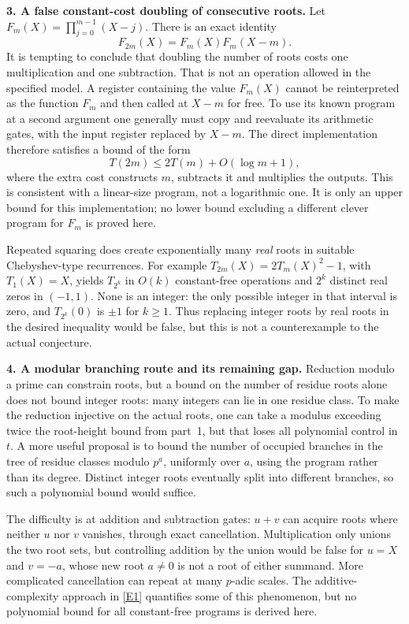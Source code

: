 \documentclass[11pt,a4paper]{article}
\newcommand{\eref}[2]{\hyperlink{extra:#1:#2}{[E#2]}}
\numberwithin{equation}{section}
\begin{document}
\textbf{3. A false constant-cost doubling of consecutive roots.}
Let $F_m(X)=\prod_{j=0}^{m-1}(X-j)$. There is an exact identity
\begin{equation}\label{224:falling}
 F_{2m}(X)=F_m(X)F_m(X-m).
\end{equation}
It is tempting to conclude that doubling the number of roots costs one
multiplication and one subtraction. That is not an operation allowed in
the specified model. A register containing the value $F_m(X)$ cannot be
reinterpreted as the function $F_m$ and then called at $X-m$ for free.
To use its known program at a second argument one generally must copy
and reevaluate its arithmetic gates, with the input register replaced by
$X-m$. The direct implementation therefore satisfies a bound of the form
\[
 T(2m)\le 2T(m)+O(\log m+1),
\]
where the extra cost constructs $m$, subtracts it and multiplies the
outputs. This is consistent with a linear-size program, not a logarithmic
one. It is only an upper bound for this implementation; no lower bound
excluding a different clever program for $F_m$ is proved here.

Repeated squaring does create exponentially many \emph{real} roots in
suitable Chebyshev-type recurrences. For example
$T_{2m}(X)=2T_m(X)^2-1$, with $T_1(X)=X$, yields $T_{2^k}$ in $O(k)$
constant-free operations and $2^k$ distinct real zeros in $(-1,1)$.
None is an integer: the only possible integer in that interval is zero,
and $T_{2^k}(0)$ is $\pm1$ for $k\ge1$. Thus replacing integer roots by
real roots in the desired inequality would be false, but this is not a
counterexample to the actual conjecture.

\textbf{4. A modular branching route and its remaining gap.}
Reduction modulo a prime can constrain roots, but a bound on the number
of residue roots alone does not bound integer roots: many integers can
lie in one residue class. To make the reduction injective on the actual
roots, one can take a modulus exceeding twice the root-height bound from
part~1, but that loses all polynomial control in $t$.
A more useful proposal is to bound the number of occupied branches in
the tree of residue classes modulo $p^a$, uniformly over $a$, using the
program rather than its degree. Distinct integer roots eventually split
into different branches, so such a polynomial bound would suffice.

The difficulty is at addition and subtraction gates: $u+v$ can acquire
roots where neither $u$ nor $v$ vanishes, through exact cancellation.
Multiplication only unions the two root sets, but controlling addition
by the union would be false for $u=X$ and $v=-a$, whose new root
$a\ne0$ is not a root
of either summand. More complicated cancellation can repeat at many
$p$-adic scales. The additive-complexity approach in \eref{224}{1}
quantifies some of this phenomenon, but no polynomial bound for all
constant-free programs is derived here.
\end{document}
